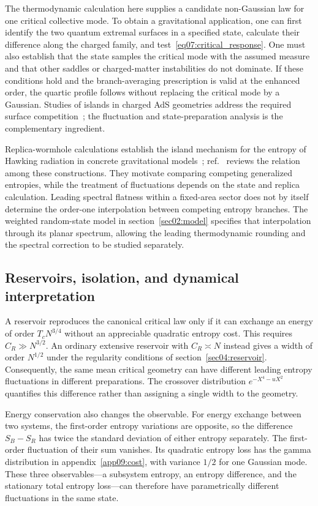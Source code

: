 \documentclass[11pt,letterpaper]{article}
\theoremstyle{plain}
\theoremstyle{definition}
\theoremstyle{remark}
\begin{document}
The thermodynamic calculation here supplies a candidate non-Gaussian law for one critical collective mode. To obtain a gravitational application, one can first identify the two quantum extremal surfaces in a specified state, calculate their difference along the charged family, and test~\eqref{eq07:critical_response}. One must also establish that the state samples the critical mode with the assumed measure and that other saddles or charged-matter instabilities do not dominate. If these conditions hold and the branch-averaging prescription is valid at the enhanced order, the quartic profile follows without replacing the critical mode by a Gaussian. Studies of islands in charged AdS geometries address the required surface competition~\cite{lin2024}; the fluctuation and state-preparation analysis is the complementary ingredient.

Replica-wormhole calculations establish the island mechanism for the entropy of Hawking radiation in concrete gravitational models~\cite{penington2020,almheiri2020,pssy2022}; ref.~\cite{almheirietal2021} reviews the relation among these constructions. They motivate comparing competing generalized entropies, while the treatment of fluctuations depends on the state and replica calculation. Leading spectral flatness within a fixed-area sector does not by itself determine the order-one interpolation between competing entropy branches. The weighted random-state model in section~\ref{sec02:model} specifies that interpolation through its planar spectrum, allowing the leading thermodynamic rounding and the spectral correction to be studied separately.

\subsection{Reservoirs, isolation, and dynamical interpretation}
\label{sec07:ensembles}

A reservoir reproduces the canonical critical law only if it can exchange an energy of order $T_cN^{3/4}$ without an appreciable quadratic entropy cost. This requires $C_R\gg N^{3/2}$. An ordinary extensive reservoir with $C_R\asymp N$ instead gives a width of order $N^{1/2}$ under the regularity conditions of section~\ref{sec04:reservoir}. Consequently, the same mean critical geometry can have different leading entropy fluctuations in different preparations. The crossover distribution $e^{-X^4-uX^2}$ quantifies this difference rather than assigning a single width to the geometry.

Energy conservation also changes the observable. For energy exchange between two systems, the first-order entropy variations are opposite, so the difference $S_B-S_R$ has twice the standard deviation of either entropy separately. The first-order fluctuation of their sum vanishes. Its quadratic entropy loss has the gamma distribution in appendix~\ref{app09:cost}, with variance $1/2$ for one Gaussian mode. These three observables---a subsystem entropy, an entropy difference, and the stationary total entropy loss---can therefore have parametrically different fluctuations in the same state.
\end{document}
